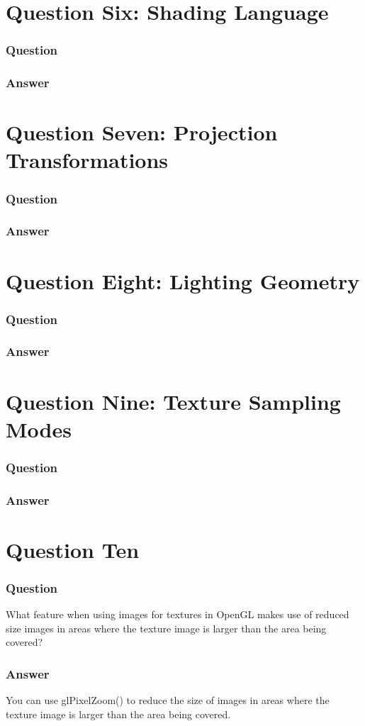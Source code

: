 \documentclass{report}
\begin{document}
\part{Question Six: Shading Language}
\section{Question}
\section{Answer}
\part{Question Seven: Projection Transformations}
\section{Question}
\section{Answer}
\part{Question Eight: Lighting Geometry}
\section{Question}
\section{Answer}
\part{Question Nine: Texture Sampling Modes}
\section{Question}
\section{Answer}
\part{Question Ten}
\section{Question}
What feature when using images for textures in OpenGL makes use of reduced size images in areas where the texture image is larger than the area being covered?
\section{Answer}
You can use glPixelZoom() to reduce the size of images in areas where the texture image is larger than the area being covered.
\end{document}
